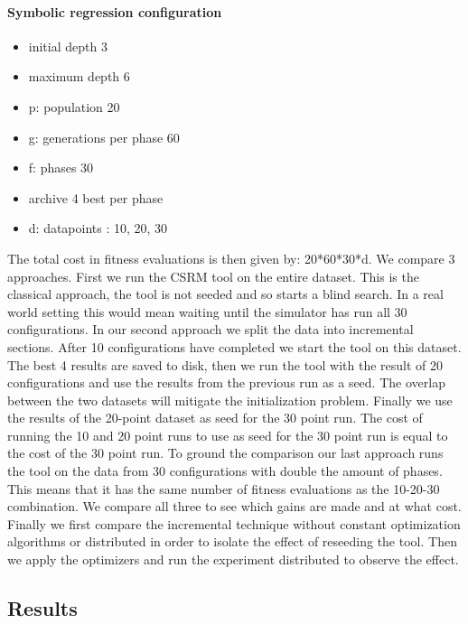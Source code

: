 \paragraph{Symbolic regression configuration}
\begin{itemize}
\item initial depth 3
\item maximum depth 6
\item p: population 20
\item g: generations per phase 60
\item f: phases 30
\item archive 4 best per phase
\item d: datapoints : 10, 20, 30
\end{itemize}
The total cost in fitness evaluations is then given by: 20*60*30*d.
We compare 3 approaches. First we run the CSRM tool on the entire dataset. This is the classical approach, the tool is not seeded and so starts a blind search. In a real world setting this would mean waiting until the simulator has run all 30 configurations.
In our second approach we split the data into incremental sections. After 10 configurations have completed we start the tool on this dataset. 
The best 4 results are saved to disk, then we run the tool with the result of 20 configurations and use the results from the previous run as a seed. The overlap between the two datasets will mitigate the initialization problem. Finally we use the results of the 20-point dataset as seed for the 30 point run. 
The cost of running the 10 and 20 point runs to use as seed for the 30 point run is equal to the cost of the 30 point run. 
To ground the comparison our last approach runs the tool on the data from 30 configurations with double the amount of phases. This means that it has the same number of fitness evaluations as the 10-20-30 combination. We compare all three to see which gains are made and at what cost.
Finally we first compare the incremental technique without constant optimization algorithms or distributed in order to isolate the effect of reseeding the tool.
Then we apply the optimizers and run the experiment distributed to observe the effect.
\subsection{Results}
